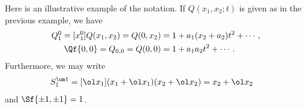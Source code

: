 \begin{example}Here is an illustrative example of the notation. If $Q(x_1,x_2;t)$ is given as in the previous example, we have
\begin{align}
	Q_1^0 = [x_1^0]Q(x_1,x_2) = Q(0,x_2) &= 1 + a_1(x_2+a_2)t^2+\cdots\,,\\
	\Qf{0,0} = Q_{0,0} = Q(0,0) &= 1 + a_1a_2 t^2+\cdots\,.
\end{align}
Furthermore, we may write
\begin{align}
	S_1^{\um 1} &= [\ol x_1](x_1+\ol x_1)(x_2+\ol x_2) = x_2+\ol x_2
\end{align}
and $\Sf{\pm 1,\pm1}  = 1$.
\end{example}

\endinput
